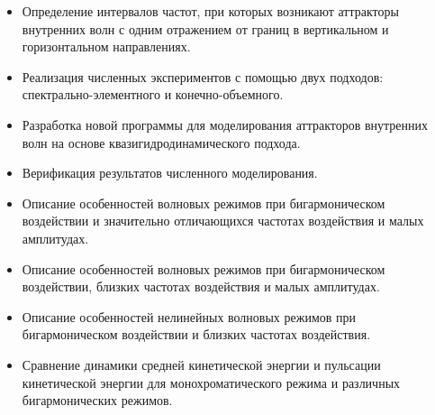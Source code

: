 \documentclass[utf8x]{G7-32} %
\begin{document}
\begin{itemize}

  \item 
    Определение интервалов частот, при которых возникают аттракторы внутренних волн с одним отражением от границ в вертикальном и горизонтальном направлениях.
  

    
    
  \item Реализация численных экспериментов с помощью двух подходов: спектрально-элементного и конечно-объемного.

  \item Разработка новой программы для моделирования аттракторов внутренних волн на основе квазигидродинамического подхода.
    
  \item Верификация результатов численного моделирования.

  \item Описание особенностей волновых режимов при бигармоническом воздействии и значительно отличающихся частотах воздействия и малых амплитудах.

  \item Описание особенностей волновых режимов при бигармоническом воздействии, близких частотах воздействия и малых амплитудах.
    
  \item Описание особенностей нелинейных волновых режимов при бигармоническом воздействии и близких частотах воздействия.

  \item Сравнение динамики средней кинетической энергии и пульсации кинетической энергии для монохроматического режима и различных бигармонических режимов.
    
\end{itemize}
\end{document}
